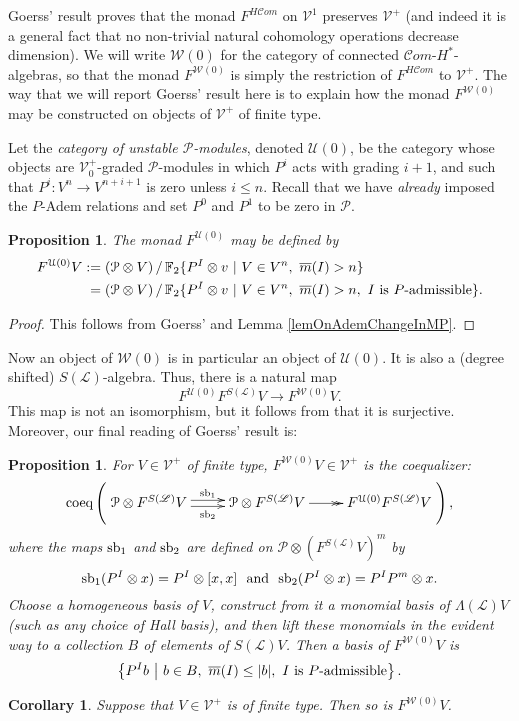 \documentclass[11pt]{amsart} \renewcommand{\baselinestretch}{1.4}
\theoremstyle{plain}
\newtheorem{prop}[thm]{Proposition}
\newtheorem{cor}[thm]{Corollary}
\theoremstyle{definition}
\renewcommand{\to}{\longrightarrow}
\newcommand{\scrL}{\mathscr{L}}
\newcommand{\scrC}{\mathscr{C}}
\newcommand{\calU}{\mathcal{U}}
\newcommand{\calP}{\mathcal{P}}
\newcommand{\calV}{\mathcal{V}}
\newcommand{\calw}{\mathcal{W}}
\newcommand{\calu}{\mathcal{U}}
\newcommand{\Palg}{{\calP}}
\newcommand{\LieOperad}{{\scrL}}
\newcommand{\vect}[2]{\calV^{#1}_{#2}}
\newcommand{\HA}[1]{H#1}
\newcommand{\minDimP}{\overline{m}}
\newcommand{\F}{\mathbb{F}}
\newcommand{\algs}{{\scrC\!\textit{om}}}
\newcommand{\Ftwo}{\F_2}
\begin{document}
\begin{Constructing cohomology operations}
Goerss' result proves that the monad
$F^{\HA{\algs}}$ on $\vect{1}{}$
preserves $\vect{+}{}$ (and indeed it is a general fact that no non-trivial natural cohomology operations decrease dimension).
We will write $\calw(0)$ for the category of connected $\algs$-$H^*$-algebras, so that the monad $F^{\calw(0)}$  is simply the restriction of $F^{\HA{\algs}}$ to $\vect{+}{}$. The way that we will report Goerss' result here is to explain how the monad $F^{\calw(0)}$ may be constructed on objects of $\vect{+}{}$ of finite type.

Let the \emph{category of unstable $\Palg$-modules}, denoted $\calU(0)$, be the category whose objects are $\vect{+}{0}$-graded $\Palg$-modules in which $P^i$ acts with grading $i+1$, and such that $P^i:V^n\to V^{n+i+1}$ is zero unless $i\leq n$. Recall that  we have \emph{already} imposed the $P$-Adem relations and set $P^0$ and $P^1$ to be zero in $\Palg$. 
\begin{prop}
The monad $F^{\calU(0)}$ may be defined by
\begin{alignat*}{2}
F^{\calU(0)}V
:={}&
(\Palg\otimes V)\,/\,\Ftwo \{P^I\otimes v\ |\ V\in V^n,\ \minDimP(I)>n \}%
\\
={}&
(\Palg\otimes V)\,/\,\Ftwo \{P^I\otimes v\ |\ V\in V^n,\ \minDimP(I)>n ,\ I\textup{ is $P$-admissible}\}.%
\end{alignat*}
\end{prop}
\begin{proof}
This follows from Goerss' \cite[Theorem I]{MR1089001} and Lemma \ref{lemOnAdemChangeInMP}.
\end{proof}
Now an object of $\calw(0)$ is in particular an object of $\calU(0)$. It is also a (degree shifted) $S(\LieOperad)$-algebra. Thus, there  is a natural map 
\[F^{\calU(0)}F^{S(\LieOperad)}V\to F^{\calw(0)}V.\]
This map is not an isomorphism, but it follows from \cite[Theorem I]{MR1089001} that it is surjective. Moreover, our final reading of Goerss' result is:
\begin{prop}
\label{partialgoerss}
For $V\in\vect{+}{}$ of finite type,  $F^{\calw(0)}V\in \vect{+}{}$ is the coequalizer:
\[\textup{coeq}\left(\xymatrix@R=4mm{
\Palg\otimes F^{S(\LieOperad)}V
\ar@<+.5ex>[r]^-{\smash{\textup{sb}_1}}
\ar@<-.5ex>[r]_-{\textup{sb}_2}
&%
\Palg\otimes F^{S(\LieOperad)}V
\ar@{->>}[r]
&
F^{\calu(0)}F^{S(\LieOperad)}V%
}\right),\]
where the maps $\textup{sb}_1$ and $\textup{sb}_2$ are defined on  $\Palg\otimes(F^{S(\LieOperad)}V)^{m}$ by
\[\textup{sb}_1(P^I\otimes x)=P^I\otimes [x,x]\textup{ \ and \ }\textup{sb}_2(P^I\otimes x)=P^IP^m\otimes x.\]
Choose a homogeneous basis of $V$, construct from it a monomial  basis of $\Lambda(\LieOperad)V$ (such as any choice of Hall basis), and then lift these monomials in the evident way to a collection $B$ of elements of $S(\LieOperad)V$. Then a basis of $F^{\calw(0)}V$ is 
\[\left\{P^Ib\ \middle|\ b\in B,\ \minDimP(I)\leq|b|,\ \textup{$I$ is $P$-admissible}\right\}.\]
\end{prop}
\begin{cor}
\label{finite type pres by FW0}
Suppose that $V\in\vect{+}{}$ is of finite type. Then so is $F^{\calw(0)}V$.
\end{cor}


\end{Constructing cohomology operations}
\end{document}
